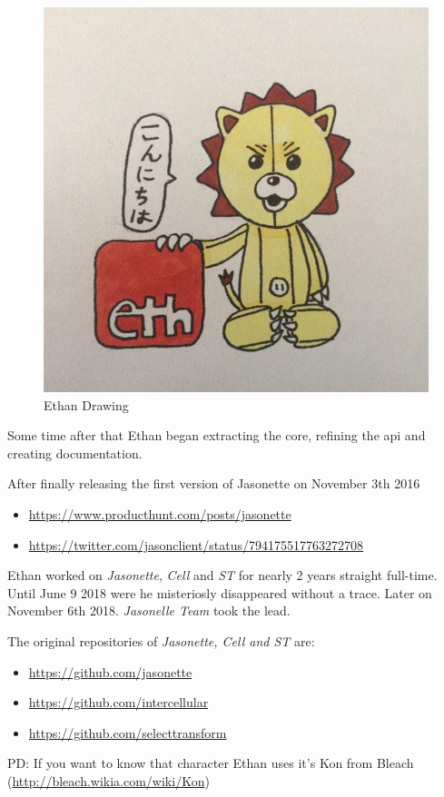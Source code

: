\documentclass[]{book}
\providecommand{\tightlist}{%
  \setlength{\itemsep}{0pt}\setlength{\parskip}{0pt}}
\begin{document}
\begin{figure}
\centering
\includegraphics{images/history/ethan.jpeg}
\caption{Ethan Drawing}
\end{figure}

Some time after that Ethan began extracting the core, refining the api
and creating documentation.

After finally releasing the first version of Jasonette on November 3th
2016

\begin{itemize}
\item
  \url{https://www.producthunt.com/posts/jasonette}
\item
  \url{https://twitter.com/jasonclient/status/794175517763272708}
\end{itemize}

Ethan worked on \emph{Jasonette}, \emph{Cell} and \emph{ST} for nearly 2
years straight full-time. Until June 9 2018 were he misteriosly
disappeared without a trace. Later on November 6th 2018. \emph{Jasonelle
Team} took the lead.

The original repositories of \emph{Jasonette, Cell and ST} are:

\begin{itemize}
\tightlist
\item
  \url{https://github.com/jasonette}
\item
  \url{https://github.com/intercellular}
\item
  \url{https://github.com/selecttransform}
\end{itemize}

PD: If you want to know that character Ethan uses it's Kon from Bleach 💯
(\url{http://bleach.wikia.com/wiki/Kon})


\end{document}
